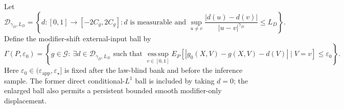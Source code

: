 Let
\[
 \mathcal D_{\gamma_D,L_D}
 =\left\{d:[0,1]\to[-2C_g,2C_g]:d\text{ is measurable and }
 \sup_{u\ne v}\frac{|d(u)-d(v)|}{|u-v|^{\gamma_D}}\le L_D\right\}.
\]
Define the modifier-shift external-input ball by
\[
 \Gamma(P,\varepsilon_0)
 =\left\{g\in\mathcal G:\ \exists d\in\mathcal D_{\gamma_D,L_D}\text{ such that }
 \operatorname*{ess\,sup}_{v\in[0,1]}
 E_P[|g_0(X,V)-g(X,V)-d(V)|\mid V=v]
 \le\varepsilon_0\right\}.
\]
Here \(\varepsilon_0\in(\varepsilon_{\mathrm{app}},\varepsilon_\star]\) is fixed after the law-blind bank and before the inference sample.  The former direct conditional-\(L^1\) ball is included by taking \(d=0\); the enlarged ball also permits a persistent bounded smooth modifier-only displacement.